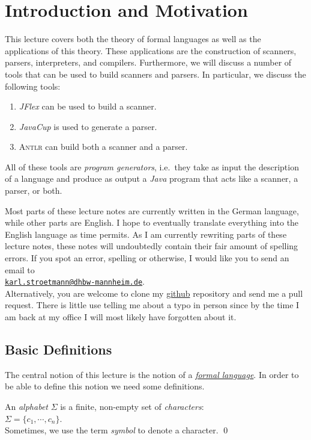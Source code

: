 \chapter{Introduction and Motivation}
This lecture covers both the theory of formal languages as well as the applications of this theory.
These applications are the construction of scanners, parsers, interpreters, and compilers.  Furthermore, we
will discuss a number of tools that can be used to build scanners and parsers.  In particular, we
discuss the following tools:
\begin{enumerate}
\item \textsl{JFlex} can be used to build a scanner.
\item \textsl{JavaCup} is used to generate a parser.
\item \textsc{Antlr} can build both a scanner and a parser.
\end{enumerate}
All of these tools are \emph{program generators}, i.e.~they take as input the description of a
language and produce as output a \textsl{Java} program that acts like a scanner, a parser, or both. 

Most parts of these lecture notes are currently written in the German language, while other parts 
are English.  I hope to eventually translate everything into the English language as time permits.
As I am currently rewriting parts of these lecture notes, these notes will undoubtedly contain their
fair amount of spelling errors.  If you spot an error, spelling or otherwise, I would like you to
send an email to 
\\[0.2cm]
\hspace*{1.3cm}
\href{mailto:karl.stroetmann@dhbw-mannheim.de}{\texttt{karl.stroetmann@dhbw-mannheim.de}}.
\\[0.2cm]
Alternatively, you are welcome to clone my
\href{https://github.com/karlstroetmann/Formal-Languages/}{github}
repository and send me a pull request.
There is little use telling me about a typo in person since by the time I am back at my office I
will most likely have forgotten about it.  


\section{Basic Definitions}
The central notion of this lecture is the notion of a 
\href{http://en.wikipedia.org/wiki/Formal_language}{\emph{formal language}}.
In order to be able to define this notion we need some definitions. 


\begin{Definition}[Alphabet]
An \emph{alphabet} $\Sigma$ is a finite, non-empty set of \emph{characters}:
\\[0.2cm]
\hspace*{1.3cm}
$\Sigma = \{ c_1, \cdots, c_n \}$. 
\\[0.2cm]
Sometimes, we use the term \emph{symbol} to denote a character.
\qed
\end{Definition}

